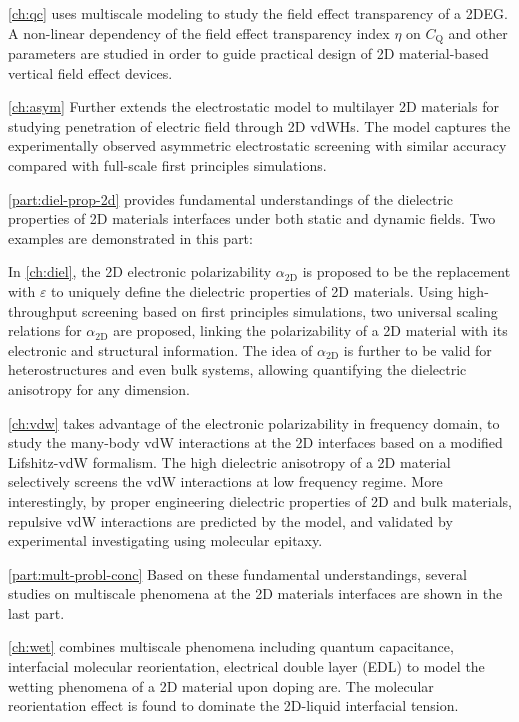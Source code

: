 \autoref{ch:qc} uses multiscale modeling to study the field effect
transparency of a 2DEG. A non-linear dependency of the field effect
transparency index $\eta$ on $C_{\mathrm{Q}}$ and other parameters are
studied in order to guide practical design of 2D material-based
vertical field effect devices.
%

\autoref{ch:asym} Further extends the electrostatic model to
multilayer 2D materials for studying penetration of electric field
through 2D vdWHs. The model captures the experimentally observed
asymmetric electrostatic screening with similar accuracy compared with
full-scale first principles simulations.

\autoref{part:diel-prop-2d} provides fundamental understandings of the
dielectric properties of 2D materials interfaces under both static and
dynamic fields. Two examples are demonstrated in this part:
%

In \autoref{ch:diel}, the 2D electronic polarizability
$\alpha_{\mathrm{2D}}$ is proposed to be the replacement with
$\varepsilon$ to uniquely define the dielectric properties of 2D
materials. Using high-throughput screening based on first principles
simulations, two universal scaling relations for
$\alpha_{\mathrm{2D}}$ are proposed, linking the polarizability of a
2D material with its electronic and structural information.
%
The idea
of $\alpha_{\mathrm{2D}}$ is further to be valid for heterostructures
and even bulk systems, allowing quantifying the dielectric anisotropy
for any dimension.
%

\autoref{ch:vdw} takes advantage of the electronic polarizability
in frequency domain, to study the many-body vdW interactions at the 2D
interfaces based on a modified Lifshitz-vdW
formalism. The high dielectric anisotropy of a 2D material selectively
screens the vdW interactions at low frequency regime. More
interestingly, by proper engineering dielectric properties of 2D and
bulk materials, repulsive vdW interactions are predicted by the model,
and validated by experimental investigating using molecular epitaxy.

\autoref{part:mult-probl-conc} Based on these fundamental understandings, several
studies on multiscale phenomena at the 2D materials interfaces are
shown in the last part.
%

\autoref{ch:wet} combines multiscale phenomena including quantum capacitance,
interfacial molecular reorientation, electrical double layer (EDL) to model
the wetting phenomena of a 2D material upon doping are. The
molecular reorientation effect is found to dominate the 2D-liquid
interfacial tension.
%

